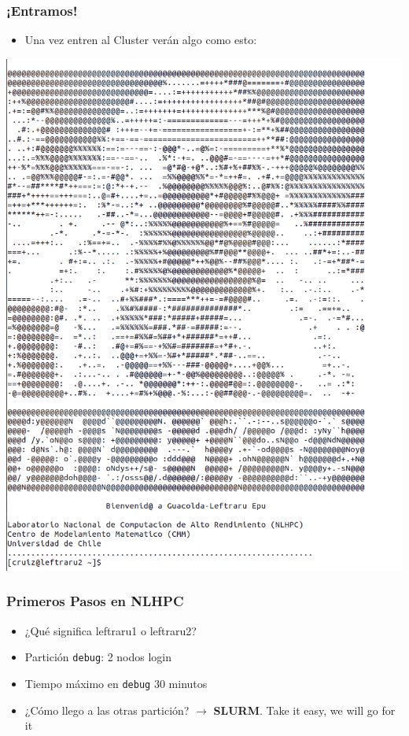 \documentclass[aspectratio=169,professionalfonts]{beamer}
\begin{document}
\begin{frame}[fragile]
\frametitle{\textbf{¡Entramos!}}
\begin{itemize}
    \item Una vez entren al Cluster verán algo como esto: 
\end{itemize}
\begin{center}
\includegraphics[scale=0.2]{FIGURES/log_in_1.png}
\end{center}
 \vspace{0.5em}
\end{frame}


\begin{frame}[fragile]
\frametitle{\textbf{Primeros Pasos en NLHPC}}
\begin{itemize}
    \item ¿Qué significa leftraru1 o leftraru2? 
            \vspace{0.5em} 

    \item Partición \texttt{debug}: 2 nodos login 
            \vspace{0.5em} 

    \item Tiempo máximo en \texttt{debug} 30 minutos 
            \vspace{0.5em} 

    \item ¿Cómo llego a las otras partición? $\rightarrow$ \textbf{SLURM}. Take it easy, we will go for it
\end{itemize}
    
\end{frame}
\end{document}
